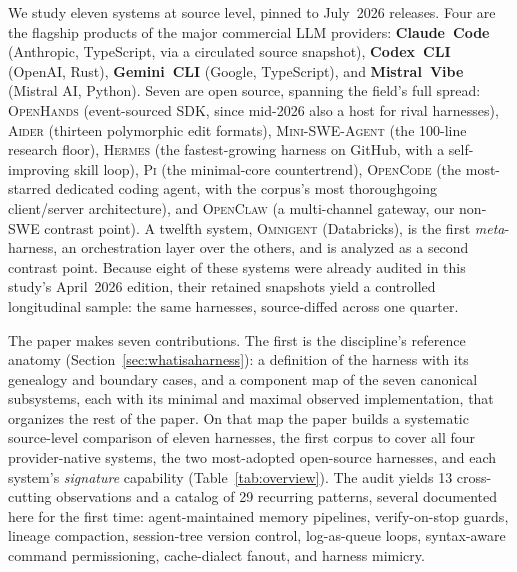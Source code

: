 \documentclass[11pt,a4paper]{article}
\newcommand{\oh}{\textsc{OpenHands}\xspace}
\newcommand{\adr}{\textsc{Aider}\xspace}
\newcommand{\mswe}{\textsc{Mini-SWE-Agent}\xspace}
\newcommand{\ocl}{\textsc{OpenClaw}\xspace}
\newcommand{\hrm}{\textsc{Hermes}\xspace}
\newcommand{\pib}{\textsc{Pi}\xspace}
\newcommand{\ocd}{\textsc{OpenCode}\xspace}
\newcommand{\omni}{\textsc{Omnigent}\xspace}
\begin{document}
We study eleven systems at source level, pinned to July~2026 releases.
Four are the flagship products of the major commercial LLM providers: \textbf{Claude~Code} (Anthropic, TypeScript, via a circulated source snapshot), \textbf{Codex~CLI} (OpenAI, Rust), \textbf{Gemini~CLI} (Google, TypeScript), and \textbf{Mistral~Vibe} (Mistral AI, Python).
Seven are open source, spanning the field's full spread: \oh{} (event-sourced SDK, since mid-2026 also a host for rival harnesses), \adr{} (thirteen polymorphic edit formats), \mswe{} (the 100-line research floor), \hrm{} (the fastest-growing harness on GitHub, with a self-improving skill loop), \pib{} (the minimal-core countertrend), \ocd{} (the most-starred dedicated coding agent, with the corpus's most thoroughgoing client/server architecture), and \ocl{} (a multi-channel gateway, our non-SWE contrast point).
A twelfth system, \omni{} (Databricks), is the first \emph{meta}-harness, an orchestration layer over the others, and is analyzed as a second contrast point.
Because eight of these systems were already audited in this study's April~2026 edition, their retained snapshots yield a controlled longitudinal sample: the same harnesses, source-diffed across one quarter.

The paper makes seven contributions.
The first is the discipline's reference anatomy (Section~\ref{sec:whatisaharness}): a definition of the harness with its genealogy and boundary cases, and a component map of the seven canonical subsystems, each with its minimal and maximal observed implementation, that organizes the rest of the paper.
On that map the paper builds a systematic source-level comparison of eleven harnesses, the first corpus to cover all four provider-native systems, the two most-adopted open-source harnesses, and each system's \emph{signature} capability (Table~\ref{tab:overview}).
The audit yields 13 cross-cutting observations and a catalog of 29 recurring patterns, several documented here for the first time: agent-maintained memory pipelines, verify-on-stop guards, lineage compaction, session-tree version control, log-as-queue loops, syntax-aware command permissioning, cache-dialect fanout, and harness mimicry.
\end{document}
